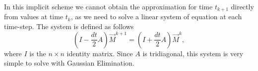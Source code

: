 \documentclass[final,1p,times]{elsarticle}
\begin{document}
In this implicit scheme we cannot obtain the approximation for time $t_{k+1}$ directly from values at time $t_k$, as we need to solve a linear system of equation at each time-step. The system is defined as follows
\begin{equation}
(I-\frac{dt}{2}A)\vec{M}^{k+1}=(I+\frac{dt}{2}A)\vec{M}^{k},
\end{equation}
where $I$ is the $n\times n$ identity matrix. Since $A$ is tridiagonal, this system is very simple to solve with Gaussian Elimination.






 






\end{document}
